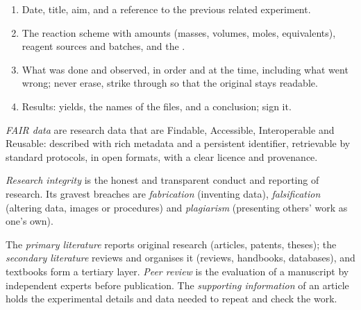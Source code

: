 \begin{method}\label{met:b3:lab-techniques-3:notebook}
\begin{enumerate}
  \item Date, title, aim, and a reference to the previous related experiment.
  \item The reaction scheme with amounts (masses, volumes, moles, equivalents),
        reagent sources and batches, and the .
  \item What was done and observed, in order and at the time, including what went
        wrong; never erase, strike through so that the original stays readable.
  \item Results: yields, the names of the  files, and a conclusion; sign it.
\end{enumerate}
\end{method}

\begin{definition}\label{def:b3:lab-techniques-3:fair}
\emph{FAIR data} are research data that are Findable,
Accessible, Interoperable and Reusable: described with rich metadata and a
persistent identifier, retrievable by standard protocols, in open formats, with
a clear licence and provenance.
\end{definition}

\begin{definition}\label{def:b3:lab-techniques-3:integrity}
\emph{Research integrity} is the honest and
transparent conduct and reporting of research. Its gravest breaches are
\emph{fabrication} (inventing data), \emph{falsification}
(altering data, images or procedures) and \emph{plagiarism}
(presenting others' work as one's own).
\end{definition}

\begin{definition}\label{def:b3:lab-techniques-3:literature}
The \emph{primary literature} reports original
research (articles, patents, theses); the \emph{secondary
literature} reviews and organises it (reviews,
handbooks, databases), and textbooks form a tertiary layer. \emph{Peer
review} is the evaluation of a manuscript by independent experts
before publication. The \emph{supporting information}
of an article holds the experimental details and data needed to
repeat and check the work.
\end{definition}

